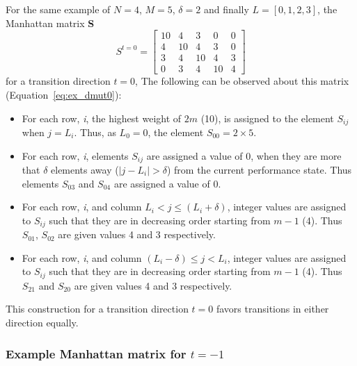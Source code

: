 For the same example of $N = 4$, $M = 5$, $\delta = 2$ and finally $L = [0,1,2,3]$, 
the Manhattan matrix \textbf{S}
\begin{equation}
    S^{t = 0} = \left[
     \begin{array}{ccccc}
       10 & 4 & 3 & 0 & 0 \\
       4 & 10 & 4 & 3 & 0 \\
       3 & 4 & 10 & 4 & 3 \\
       0 & 3 & 4 & 10 & 4
     \end{array}
   \right]
\label{eq:ex_dmut0}
\end{equation}
 for a transition direction $t = 0$, The following can be observed about this matrix (Equation~\eqref{eq:ex_dmut0}):
\begin{itemize}
\item For each row, \textit{i}, the highest weight of $2m$ (10), is assigned to the element 
$S_{ij}$ when $j = L_i$. Thus, as $L_0 = 0$, the element $S_{00} = 2 \times 5$.
\item For each row, \textit{i}, elements $S_{ij}$ are assigned a value of 0, 
when they are more that $\delta$ elements away ($|j - L_i| > \delta$) from the current performance state. 
Thus elements $S_{03}$ and $S_{04}$ are assigned a value of 0.
\item For each row, \textit{i}, and column $L_i < j \leq (L_i + \delta)$, integer values are assigned 
to $S_{ij}$ such that they are in decreasing order starting from $m-1$ (4).
Thus $S_{01}$, $S_{02}$ are given values 4 and 3 respectively. 
\item For each row, \textit{i}, and column $(L_i - \delta) \leq j < L_i$, integer values are assigned 
to $S_{ij}$ such that they are in decreasing order starting from $m-1$ (4).
Thus $S_{21}$ and $S_{20}$ are given values 4 and 3 respectively.
\end{itemize}
This construction for a transition direction $t = 0$ favors transitions in either direction equally. 


\subsubsection{Example Manhattan matrix for $t = -1$}~\label{sec:delta_matrix_m}

